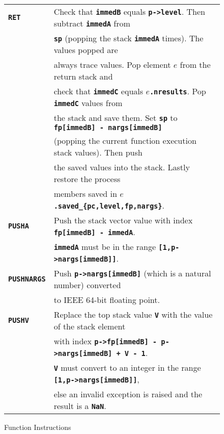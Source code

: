 \documentclass[12pt]{article}
\newcommand{\TT}[1]{{\tt \bfseries #1}}
\newlength{\figurewidth}
\newenvironment{boxedfigure}[1][!btp]%
	{\begin{figure*}[#1]
	 \begin{lrbox}{\figurebox}
	 \begin{minipage}{\figurewidth}

	 \vspace*{1ex}}%
	{
	 \vspace*{1ex}

	 \end{minipage}
	 \end{lrbox}

	 \centering
	 \fbox{\hspace*{0.1in}\usebox{\figurebox}\hspace*{0.1in}}
	 \end{figure*}}
\begin{document}
\begin{boxedfigure}
\begin{center}
\begin{tabular}{|l|l|}
\TT{RET}
    & Check that \TT{immedB} equals \TT{p->level}.  Then subtract
      \TT{immedA} from \\
    & \TT{sp} (popping the stack \TT{immedA} times).  The
      values popped are \\
    & always trace values.  Pop element $e$ from the
      return stack and \\
    & check that \TT{immedC} equals \TT{$e$.nresults}.  Pop \TT{immedC}
      values from \\
    & the stack and save them.  Set \TT{sp} to
      \TT{fp[immedB] - nargs[immedB]} \\
    & (popping the current function execution stack values).   Then push \\
    & the saved values into the stack.  Lastly restore the process \\
    & members saved in \TT{$e$.saved\_\{pc,level,fp,nargs\}}.
\\\hline
\TT{PUSHA}
    & Push the stack vector value with index \TT{fp[immedB] - immedA}. \\
    & \TT{immedA} must be 
      in the range \TT{[1,p->nargs[immedB]]}.
\\\hline
\TT{PUSHNARGS}
    & Push \TT{p->nargs[immedB]} (which is a natural number)
      converted \\
    & to IEEE 64-bit floating point.
\\\hline
\TT{PUSHV}
    & Replace the top stack value \TT{V} with the value of the stack element \\
    & with index \TT{p->fp[immedB] - p->nargs[immedB] + V - 1}. \\ 
    & \TT{V} must convert to an integer in the
      range \TT{[1,p->nargs[immedB]]}, \\
    & else an invalid exception is raised and the result is a \TT{NaN}.
\\\hline
\end{tabular}
\end{center}
\caption{Function Instructions}
\label{FUNCTION-INSTRUCTIONS}
\end{boxedfigure}

\clearpage
\end{document}
